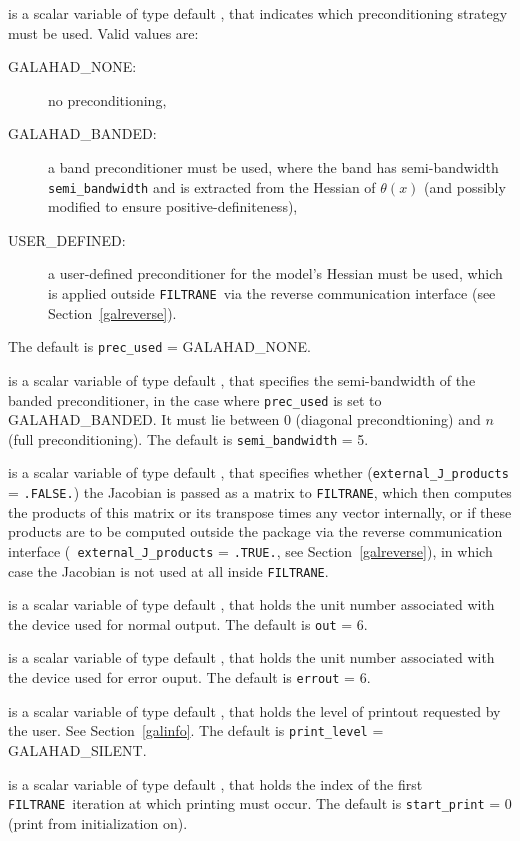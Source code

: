 \documentclass{galahad}
\newcommand{\packagename}{FILTRANE}
\newcommand{\sym}{\sf\small}
\newcommand{\filtrane}{{\tt \packagename}}
\begin{document}
\begin{description}
 is a scalar variable of type default \integer, that indicates
which preconditioning strategy must be used. Valid values are:
\begin{description}
\item[\sym GALAHAD\_NONE:] no preconditioning,
\item[\sym GALAHAD\_BANDED:] a band preconditioner must be used, where the
band has semi-bandwidth {\tt semi\_bandwidth} and is extracted from
the Hessian of $\theta(x)$ (and possibly modified to ensure
positive-definiteness),
\item[\sym USER\_DEFINED:] a user-defined preconditioner for the model's
Hessian must be used, which is applied outside \filtrane\ via the reverse
communication interface (see Section~\ref{galreverse}).
\end{description}
The default is {\tt prec\_used} = {\sym GALAHAD\_NONE}.

 is a scalar variable of type default \integer, that 
specifies the semi-bandwidth of the banded preconditioner, in the case where
{\tt prec\_used} is set to {\sym GALAHAD\_BANDED}. It must lie between
0 (diagonal precondtioning) and $n$ (full preconditioning).
The default is {\tt semi\_bandwidth} = 5.

 is a scalar variable of type default \logical, that 
specifies whether ({\tt external\_J\_products} = {\tt .FALSE.}) the Jacobian
is passed as a matrix to \filtrane, which then computes the products of this
matrix or its transpose times any vector internally, or if these products are
to be computed outside the package via the reverse communication interface ({\tt
external\_J\_products} = {\tt .TRUE.}, see Section~\ref{galreverse}), in which
case the Jacobian is not used at all inside \filtrane.

 is a scalar variable of type default \integer, that holds the
unit number associated with the device used for normal output.
The default is {\tt out} = 6.

 is a scalar variable of type default \integer, that holds the
unit number associated with the device used for error ouput.
The default is {\tt errout} = 6.

 is a scalar variable of type default \integer, that holds the
level of printout requested by the user. See Section~\ref{galinfo}.
The default is {\tt print\_level} = {\sym GALAHAD\_SILENT}.

 is a scalar variable of type default \integer, that holds
the index of the first \filtrane\ iteration at which printing must occur.
The default is {\tt start\_print} = 0 (print from initialization on).


\end{description}
\end{document}

